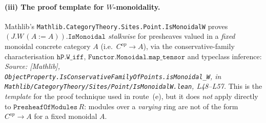 \paragraph{(iii) The proof template for $W$-monoidality.} Mathlib's
\texttt{Mathlib.CategoryTheory.Sites.Point.IsMonoidalW} proves
\((J.W\,(A := A)).\mathtt{IsMonoidal}\) \emph{stalkwise} for presheaves valued in a
\emph{fixed} monoidal concrete category \(A\) (i.e.\ \(C^{op} \to A\)), via the
conservative-family characterisation \(\mathtt{hP.W\_iff}\),
\(\mathtt{Functor.Monoidal.map\_tensor}\) and typeclass inference:
\textit{Source: [Mathlib],
\texttt{ObjectProperty.IsConservativeFamilyOfPoints.isMonoidal\_W}, in
\texttt{Mathlib/CategoryTheory/Sites/Point/IsMonoidalW.lean}, L48--L57.}
This is the \emph{template} for the proof technique used in route~(e), but it does
\emph{not} apply directly to \(\mathtt{PresheafOfModules}\,R\): modules over a
\emph{varying} ring are not of the form \(C^{op} \to A\) for a fixed monoidal
\(A\).


